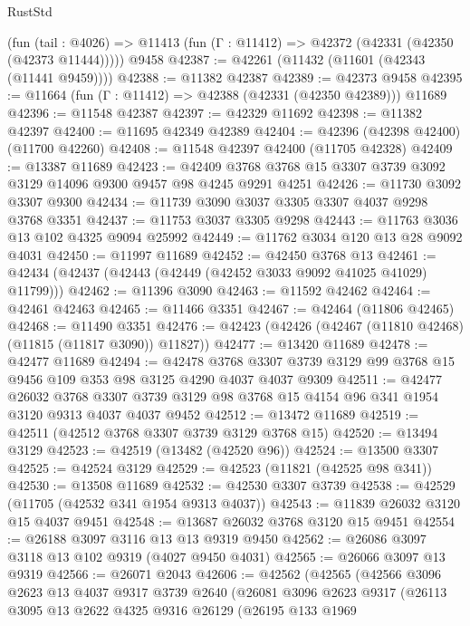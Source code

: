 \begin{lexlean}{RustStd}
\begin{coremodule}
    (fun (tail : @4026) => @11413 (fun (Γ : @11412) => @42372 (@42331 (@42350 (@42373 @11444)))))
    @9458
@42387 := @42261 (@11432 (@11601 (@42343 (@11441 @9459))))
@42388 := @11382 @42387
@42389 := @42373 @9458
@42395 := @11664 (fun (Γ : @11412) => @42388 (@42331 (@42350 @42389))) @11689
@42396 := @11548 @42387
@42397 := @42329 @11692
@42398 := @11382 @42397
@42400 := @11695 @42349 @42389
@42404 := @42396 (@42398 @42400) (@11700 @42260)
@42408 := @11548 @42397 @42400 (@11705 @42328)
@42409 := @13387 @11689
@42423 := @42409 @3768 @3768 @15 @3307 @3739 @3092 @3129 @14096 @9300 @9457 @98 @4245 @9291 @4251
@42426 := @11730 @3092 @3307 @9300
@42434 := @11739 @3090 @3037 @3305 @3307 @4037 @9298 @3768 @3351
@42437 := @11753 @3037 @3305 @9298
@42443 := @11763 @3036 @13 @102 @4325 @9094 @25992
@42449 := @11762 @3034 @120 @13 @28 @9092 @4031
@42450 := @11997 @11689
@42452 := @42450 @3768 @13
@42461 := @42434 (@42437 (@42443 (@42449 (@42452 @3033 @9092 @41025 @41029) @11799)))
@42462 := @11396 @3090
@42463 := @11592 @42462
@42464 := @42461 @42463
@42465 := @11466 @3351
@42467 := @42464 (@11806 @42465)
@42468 := @11490 @3351
@42476 := @42423 (@42426 (@42467 (@11810 @42468) (@11815 (@11817 @3090)) @11827))
@42477 := @13420 @11689
@42478 := @42477 @11689
@42494 := @42478
    @3768
    @3307
    @3739
    @3129
    @99
    @3768
    @15
    @9456
    @109
    @353
    @98
    @3125
    @4290
    @4037
    @4037
    @9309
@42511 := @42477
    @26032
    @3768
    @3307
    @3739
    @3129
    @98
    @3768
    @15
    @4154
    @96
    @341
    @1954
    @3120
    @9313
    @4037
    @4037
    @9452
@42512 := @13472 @11689
@42519 := @42511 (@42512 @3768 @3307 @3739 @3129 @3768 @15)
@42520 := @13494 @3129
@42523 := @42519 (@13482 (@42520 @96))
@42524 := @13500 @3307
@42525 := @42524 @3129
@42529 := @42523 (@11821 (@42525 @98 @341))
@42530 := @13508 @11689
@42532 := @42530 @3307 @3739
@42538 := @42529 (@11705 (@42532 @341 @1954 @9313 @4037))
@42543 := @11839 @26032 @3120 @15 @4037 @9451
@42548 := @13687 @26032 @3768 @3120 @15 @9451
@42554 := @26188 @3097 @3116 @13 @13 @9319 @9450
@42562 := @26086 @3097 @3118 @13 @102 @9319 (@4027 @9450 @4031)
@42565 := @26066 @3097 @13 @9319
@42566 := @26071 @2043
@42606 := @42562
    (@42565
      (@42566
        @3096
        @2623
        @13
        @4037
        @9317
        @3739
        @2640
        (@26081
          @3096
          @2623
          @9317
          (@26113
            @3095
            @13
            @2622
            @4325
            @9316
            @26129
            (@26195
              @133
              @1969

\end{coremodule}
\end{lexlean}
